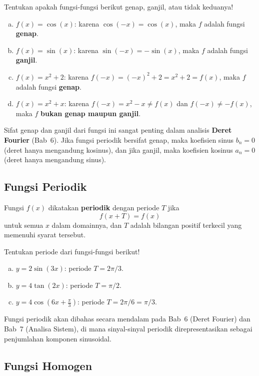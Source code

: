 \begin{exmp}
Tentukan apakah fungsi-fungsi berikut genap, ganjil, atau tidak keduanya!
\begin{enumerate}[(a)]
\item $f(x) = \cos(x)$: karena $\cos(-x) = \cos(x)$, maka $f$ adalah fungsi \textbf{genap}.
\item $f(x) = \sin(x)$: karena $\sin(-x) = -\sin(x)$, maka $f$ adalah fungsi \textbf{ganjil}.
\item $f(x) = x^2 + 2$: karena $f(-x) = (-x)^2 + 2 = x^2 + 2 = f(x)$, maka $f$ adalah fungsi \textbf{genap}.
\item $f(x) = x^2 + x$: karena $f(-x) = x^2 - x \ne f(x)$ dan $f(-x) \ne -f(x)$, maka $f$ \textbf{bukan genap maupun ganjil}.
\end{enumerate}
\end{exmp}

Sifat genap dan ganjil dari fungsi ini sangat penting dalam analisis \textbf{Deret Fourier} (Bab~6). Jika fungsi periodik bersifat genap, maka koefisien sinus $b_n = 0$ (deret hanya mengandung kosinus), dan jika ganjil, maka koefisien kosinus $a_n = 0$ (deret hanya mengandung sinus).

\subsection{Fungsi Periodik}

Fungsi $f(x)$ dikatakan \textbf{periodik} dengan periode $T$ jika
\[
f(x + T) = f(x)
\]
untuk semua $x$ dalam domainnya, dan $T$ adalah bilangan positif terkecil yang memenuhi syarat tersebut.

\begin{exmp}
Tentukan periode dari fungsi-fungsi berikut!
\begin{enumerate}[(a)]
\item $y = 2\sin(3x)$: periode $T = 2\pi/3$.
\item $y = 4\tan(2x)$: periode $T = \pi/2$.
\item $y = 4\cos\!\left(6x + \frac{\pi}{3}\right)$: periode $T = 2\pi/6 = \pi/3$.
\end{enumerate}
\end{exmp}

Fungsi periodik akan dibahas secara mendalam pada Bab~6 (Deret Fourier) dan Bab~7 (Analisa Sistem), di mana sinyal-sinyal periodik direpresentasikan sebagai penjumlahan komponen sinusoidal.

\subsection{Fungsi Homogen}

